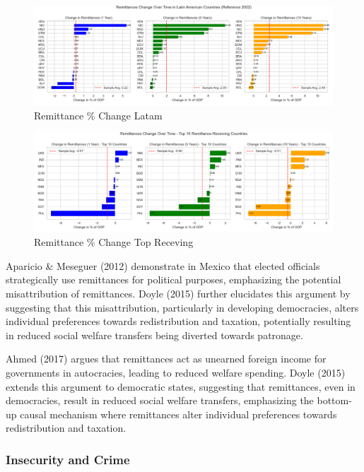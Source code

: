 \documentclass[
]{article}
\begin{document}
\begin{figure}
\hypertarget{fig:label}{%
\centering
\includegraphics[width=1\textwidth,height=1\textheight]{remlat_chg.png}
\caption{Remittance \% Change Latam}\label{fig:label}
}
\end{figure}

\begin{figure}
\hypertarget{fig:label}{%
\centering
\includegraphics[width=1\textwidth,height=1\textheight]{remtop_chg.png}
\caption{Remittance \% Change Top Receving}\label{fig:label}
}
\end{figure}

Aparicio \& Meseguer (2012) demonstrate in Mexico that elected officials
strategically use remittances for political purposes, emphasizing the
potential misattribution of remittances. Doyle (2015) further elucidates
this argument by suggesting that this misattribution, particularly in
developing democracies, alters individual preferences towards
redistribution and taxation, potentially resulting in reduced social
welfare transfers being diverted towards patronage.

Ahmed (2017) argues that remittances act as unearned foreign income for
governments in autocracies, leading to reduced welfare spending. Doyle
(2015) extends this argument to democratic states, suggesting that
remittances, even in democracies, result in reduced social welfare
transfers, emphasizing the bottom-up causal mechanism where remittances
alter individual preferences towards redistribution and taxation.

\hypertarget{insecurity-and-crime}{%
\subsubsection{Insecurity and Crime}\label{insecurity-and-crime}}
\end{document}
